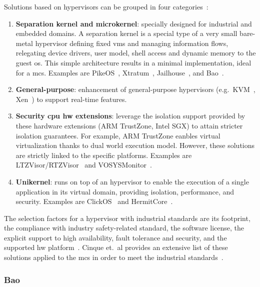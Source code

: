 Solutions based on hypervisors can be grouped in four categories~\cite{cinque2022virtualizing}:
\begin{enumerate}
\item \textbf{Separation kernel and microkernel}: specially designed for
  industrial and embedded domains. A separation kernel is a special type of a
  very small bare-metal hypervisor defining fixed \glspl{vm} and managing
  information flows, relegating device drivers, user model, shell access and
  dynamic memory to the guest \gls{os}. This simple architecture results in a
  minimal implementation, ideal for a \gls{mcs}. Examples are PikeOS~\cite{pikeOS}, Xtratum~\cite{masmano2009xtratum},
  Jailhouse~\cite{jailhouse}, and Bao~\cite{martins_et_al:OASIcs:2020:11779}.
\item \textbf{General-purpose}: enhancement of general-purpose hypervisors
  (e.g.~KVM~\cite{kivity2007kvm}, Xen~\cite{barham2003xen}) to
  support real-time features.
\item \textbf{Security \gls{cpu} \gls{hw} extensions}: leverage the isolation
  support provided by these hardware extensions (ARM TrustZone, Intel SGX) to attain stricter isolation
  guarantees. For example, ARM TrustZone eanbles virtual virtualization thanks
  to dual world execution model. However, these solutions are strictly linked to the specific
  platforms. Examples are LTZVisor/RTZVisor~\cite{pinto2016towards,rtzvisor} and VOSYSMonitor~\cite{vosysmonitor,lucas2017vosysmonitor}.%
\item \textbf{Unikernel}: runs on top of an hypervisor to enable the execution
  of a single application in its virtual domain, providing isolation,
  performance, and security. Examples are ClickOS~\cite{martins2014clickos} and HermitCore~\cite{lankes2016hermitcore}.
\end{enumerate}

The selection factors for a hypervisor with industrial standards are its footprint, the compliance with
industry safety-related standard, the software license, the explicit support to
high availability, fault tolerance and security, and the supported \gls{hw}
platform~\cite{cinque2022virtualizing}. Cinque et.~al provides an extensive list
of these solutions applied to the \gls{mcs} in order to meet the industrial standards~\cite{cinque2022virtualizing}.

\subsubsection{Bao}%
\label{sec:bao}


